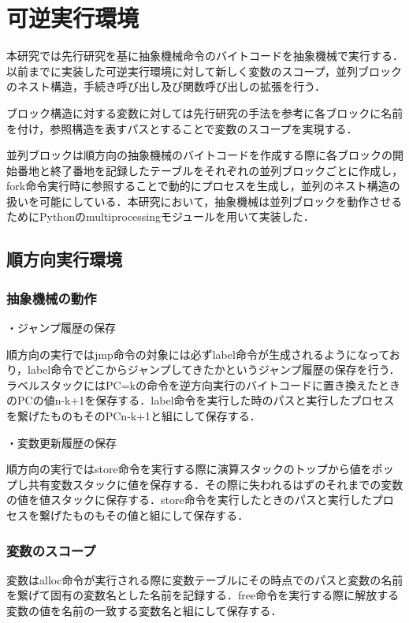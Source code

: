 \documentclass[submit,PRO]{ipsj}
\begin{document}
\section{可逆実行環境}
\label{config}

本研究では先行研究を基に抽象機械命令のバイトコードを抽象機械で実行する．以前までに実装した可逆実行環境に対して新しく変数のスコープ，並列ブロックのネスト構造，手続き呼び出し及び関数呼び出しの拡張を行う．

ブロック構造に対する変数に対しては先行研究の手法を参考に各ブロックに名前を付け，参照構造を表すパスとすることで変数のスコープを実現する．

並列ブロックは順方向の抽象機械のバイトコードを作成する際に各ブロックの開始番地と終了番地を記録したテーブルをそれぞれの並列ブロックごとに作成し，fork命令実行時に参照することで動的にプロセスを生成し，並列のネスト構造の扱いを可能にしている．本研究において，抽象機械は並列ブロックを動作させるためにPythonのmultiprocessingモジュールを用いて実装した．

\subsection{順方向実行環境}

\subsubsection{抽象機械の動作}

・ジャンプ履歴の保存

順方向の実行ではjmp命令の対象には必ずlabel命令が生成されるようになっており，label命令でどこからジャンプしてきたかというジャンプ履歴の保存を行う．ラベルスタックにはPC=kの命令を逆方向実行のバイトコードに置き換えたときのPCの値n-k+1を保存する．label命令を実行した時のパスと実行したプロセスを繋げたものもそのPCn-k+1と組にして保存する．


・変数更新履歴の保存

順方向の実行ではstore命令を実行する際に演算スタックのトップから値をポップし共有変数スタックに値を保存する．その際に失われるはずのそれまでの変数の値を値スタックに保存する．store命令を実行したときのパスと実行したプロセスを繋げたものもその値と組にして保存する．

\subsubsection{変数のスコープ}

変数はalloc命令が実行される際に変数テーブルにその時点でのパスと変数の名前を繋げて固有の変数名とした名前を記録する．free命令を実行する際に解放する変数の値を名前の一致する変数名と組にして保存する．
\end{document}
